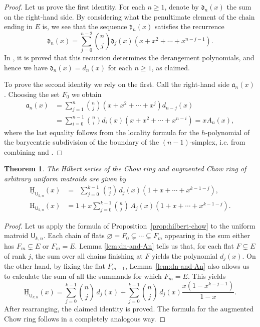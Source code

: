 \documentclass[11pt, a4paper, english]{amsart}
\theoremstyle{teoremas}
\newtheorem{theorem}{Theorem}[section]
\theoremstyle{definition}
\newcommand{\U}{\mathsf{U}}
\renewcommand{\H}{\mathrm{H}}
\newcommand{\uH}{\underline{\mathrm{H}}}
\begin{document}
\begin{proof}
    Let us prove the first identity. For each $n\geq 1$, denote by $\mathfrak{d}_n(x)$ the sum on the right-hand side. By considering what the penultimate element of the chain ending in $E$ is, we see that the sequence $\mathfrak{d}_n(x)$ satisfies the recurrence
        \[ \mathfrak{d}_n(x) = \sum_{j=0}^{n-2} \binom{n}{j} \mathfrak{d}_j(x) (x+x^2+\cdots+x^{n-j-1}).\]
    In \cite[Corollary 4.2]{juhnke-murai-sieg}, it is proved that this recursion determines the derangement polynomials, and hence we have $\mathfrak{d}_n(x)=d_n(x)$ for each $n\geq 1$, as claimed.
    
    To prove the second identity we rely on the first. Call the right-hand side $\mathfrak{a}_n(x)$. Choosing the set $F_0$ we obtain
    \begin{align*}
        \mathfrak{a}_n(x) &= \sum_{j=1}^n \binom{n}{j} (x+x^2+\cdots+x^j) d_{n-j}(x)\\
        &= \sum_{i=0}^{n-1} \binom{n}{i} d_i(x) (x+x^2+\cdots+x^{n-i}) = xA_n(x),
    \end{align*}
    where the last equality follows from the locality formula for the $h$-polynomial of the barycentric subdivision of the boundary of the $(n-1)$-simplex, i.e. from combining \cite[Proposition~2.4]{stanley-local} and \cite[Theorem~3.2]{stanley-local}.
\end{proof}

\begin{theorem}\label{thm:uniform-formulas-body}
    The Hilbert series of the Chow ring and augmented Chow ring of arbitrary uniform matroids are given by 
    \begin{align*}
        \uH_{\U_{k,n}}(x) &= \enspace \sum_{j=0}^{k-1}\, \binom{n}{j} \, d_j(x) (1+x+\cdots+x^{k-1-j}),\\
        \H_{\U_{k,n}}(x) &= 1 + x\sum_{j=0}^{k-1} \binom{n}{j}\, A_j(x) (1+x+\cdots+x^{k-1-j}).
    \end{align*}
\end{theorem}

\begin{proof}
    Let us apply the formula of Proposition~\ref{prop:hilbert-chow} to the uniform matroid $\U_{k,n}$. Each chain of flats $\varnothing=F_0\subsetneq\cdots\subsetneq F_m$ appearing in the sum either has $F_m\subsetneq E$ or $F_m=E$. Lemma \ref{lem:dn-and-An} tells us that, for each flat $F\subsetneq E$ of rank $j$, the sum over all chains finishing at $F$ yields the polynomial $d_j(x)$. On the other hand,  by fixing the flat $F_{m-1}$,  Lemma~\ref{lem:dn-and-An} also allows us to calculate the sum of all the summands for which $F_m=E$. This yields
    \[ \uH_{\U_{k,n}}(x) = \sum_{j=0}^{k-1} \binom{n}{j}\, d_j(x) + \sum_{j=0}^{k-1} \binom{n}{j}\, d_j(x) \frac{x(1-x^{k-j-1})}{1-x}.\]
    After rearranging, the claimed identity is proved. The formula for the augmented Chow ring follows in a completely analogous way. 
\end{proof}
\end{document}
